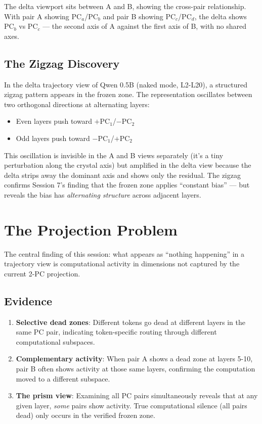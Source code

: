 \documentclass[11pt,a4paper]{article}
\begin{document}
The delta viewport sits between A and B, showing the cross-pair relationship. With pair A showing PC$_a$/PC$_b$ and pair B showing PC$_c$/PC$_d$, the delta shows PC$_b$ vs PC$_c$ — the second axis of A against the first axis of B, with no shared axes.

\subsection{The Zigzag Discovery}

In the delta trajectory view of Qwen 0.5B (naked mode, L2-L20), a structured zigzag pattern appears in the frozen zone. The representation oscillates between two orthogonal directions at alternating layers:

\begin{itemize}
\item Even layers push toward $+$PC$_1$/$-$PC$_2$
\item Odd layers push toward $-$PC$_1$/$+$PC$_2$
\end{itemize}

This oscillation is invisible in the A and B views separately (it's a tiny perturbation along the crystal axis) but amplified in the delta view because the delta strips away the dominant axis and shows only the residual. The zigzag confirms Session 7's finding that the frozen zone applies ``constant bias'' — but reveals the bias has \emph{alternating structure} across adjacent layers.

\section{The Projection Problem}

The central finding of this session: what appears as ``nothing happening'' in a trajectory view is computational activity in dimensions not captured by the current 2-PC projection.

\subsection{Evidence}

\begin{enumerate}
\item \textbf{Selective dead zones}: Different tokens go dead at different layers in the same PC pair, indicating token-specific routing through different computational subspaces.
\item \textbf{Complementary activity}: When pair A shows a dead zone at layers 5-10, pair B often shows activity at those same layers, confirming the computation moved to a different subspace.
\item \textbf{The prism view}: Examining all PC pairs simultaneously reveals that at any given layer, \emph{some} pairs show activity. True computational silence (all pairs dead) only occurs in the verified frozen zone.
\end{enumerate}
\end{document}
